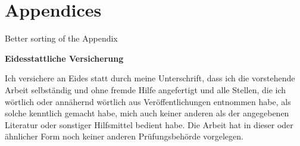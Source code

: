 \documentclass[12pt,a4paper]{article}
\begin{document}
\cleardoublepage
\appendix
\setcounter{table}{0}
\setcounter{figure}{0}
\renewcommand{\thetable}{A\arabic{table}}
\renewcommand{\thefigure}{A\arabic{figure}}


\hypertarget{appendices}{%
\section{Appendices}\label{appendices}}

Better sorting of the Appendix

\restoregeometry

\cleardoublepage
\newpage
\renewcommand*{\mkbibnamefamily}[1]{\textbf{#1}}
\renewcommand*{\mkbibnamegiven}[1]{\textbf{#1}}
\renewcommand*{\mkbibnameprefix}[1]{\textbf{#1}}
\renewcommand*{\mkbibnamesuffix}[1]{\textbf{#1}}




\newpage
\textbf{Eidesstattliche Versicherung}

\bigskip

Ich versichere an Eides statt durch meine Unterschrift, dass ich die vorstehende Arbeit selbständig und ohne fremde Hilfe angefertigt und alle Stellen, die ich wörtlich oder annähernd wörtlich aus Veröffentlichungen entnommen habe, als solche kenntlich gemacht habe, mich auch keiner anderen als der angegebenen Literatur oder sonstiger Hilfsmittel bedient habe. Die Arbeit hat in dieser oder ähnlicher Form noch keiner anderen Prüfungsbehörde vorgelegen.

\vspace{1cm}
\rule{0pt}{2\baselineskip} %
\par\noindent{} \hfill\makebox[2.25in]{\hrulefill}%
\par\noindent\makebox[2.25in][l]{} \hfill{}%
\end{document}
